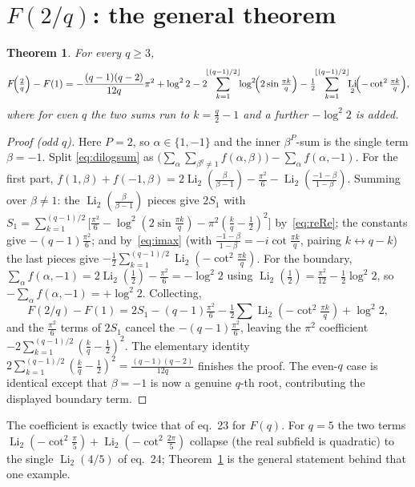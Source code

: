 \documentclass[11pt]{article}
\DeclareMathOperator{\Li}{Li}
\theoremstyle{plain}\newtheorem{theorem}{Theorem}\newtheorem{proposition}[theorem]{Proposition}
\theoremstyle{remark}\newtheorem{remark}[theorem]{Remark}
\begin{document}
\section{$F(2/q)$: the general theorem}
\begin{theorem}\label{thm:F2q}
For every $q\ge3$,
\[
  F\!\Bigl(\tfrac2q\Bigr)-F(1)=-\frac{(q-1)(q-2)}{12q}\pi^2+\log^2 2
  -2\!\!\sum_{k=1}^{\lfloor(q-1)/2\rfloor}\!\!\log^2\!\Bigl(2\sin\tfrac{\pi k}{q}\Bigr)
  -\tfrac12\!\!\sum_{k=1}^{\lfloor(q-1)/2\rfloor}\!\!\Li_2\!\Bigl(-\cot^2\tfrac{\pi k}{q}\Bigr),
\]
where for even $q$ the two sums run to $k=\tfrac q2-1$ and a further $-\log^2 2$ is added.
\end{theorem}
\begin{proof}[Proof (odd $q$)]
Here $P=2$, so $\alpha\in\{1,-1\}$ and the inner $\beta^P$-sum is the single term $\beta=-1$. Split
\eqref{eq:dilogsum} as $\bigl(\sum_\alpha\sum_{\beta^q\neq1}f(\alpha,\beta)\bigr)-\sum_\alpha f(\alpha,-1)$.
For the first part, $f(1,\beta)+f(-1,\beta)=2\Li_2(\tfrac{\beta}{\beta-1})-\tfrac{\pi^2}{6}
-\Li_2(\tfrac{-1-\beta}{1-\beta})$. Summing over $\beta\neq1$: the $\Li_2(\tfrac\beta{\beta-1})$ pieces give
$2S_1$ with $S_1=\sum_{k=1}^{(q-1)/2}\bigl[\tfrac{\pi^2}{6}-\log^2(2\sin\tfrac{\pi k}q)-\pi^2(\tfrac kq-\tfrac12)^2\bigr]$
by~\eqref{eq:reRe}; the constants give $-(q-1)\tfrac{\pi^2}{6}$; and by~\eqref{eq:imax} (with
$\tfrac{-1-\beta}{1-\beta}=-i\cot\tfrac{\pi k}{q}$, pairing $k\leftrightarrow q-k$) the last pieces give
$-\tfrac12\sum_{k=1}^{(q-1)/2}\Li_2(-\cot^2\tfrac{\pi k}q)$. For the boundary,
$\sum_{\alpha}f(\alpha,-1)=2\Li_2(\tfrac12)-\tfrac{\pi^2}{6}=-\log^2 2$ using
$\Li_2(\tfrac12)=\tfrac{\pi^2}{12}-\tfrac12\log^2 2$, so $-\sum_\alpha f(\alpha,-1)=+\log^2 2$. Collecting,
\[
  F(2/q)-F(1)=2S_1-(q-1)\tfrac{\pi^2}{6}-\tfrac12\!\sum\Li_2(-\cot^2\tfrac{\pi k}q)+\log^2 2 ,
\]
and the $\tfrac{\pi^2}{6}$ terms of $2S_1$ cancel the $-(q-1)\tfrac{\pi^2}{6}$, leaving the $\pi^2$ coefficient
$-2\sum_{k=1}^{(q-1)/2}(\tfrac kq-\tfrac12)^2$. The elementary identity
$2\sum_{k=1}^{(q-1)/2}(\tfrac kq-\tfrac12)^2=\tfrac{(q-1)(q-2)}{12q}$ finishes the proof. The even-$q$ case is
identical except that $\beta=-1$ is now a genuine $q$-th root, contributing the displayed boundary term.
\end{proof}
The coefficient is exactly twice that of eq.~23 for $F(q)$. For $q=5$ the two terms
$\Li_2(-\cot^2\tfrac\pi5)+\Li_2(-\cot^2\tfrac{2\pi}5)$ collapse (the real subfield is quadratic) to the single
$\Li_2(4/5)$ of eq.~24; Theorem~\ref{thm:F2q} is the general statement behind that one example.
\end{document}
